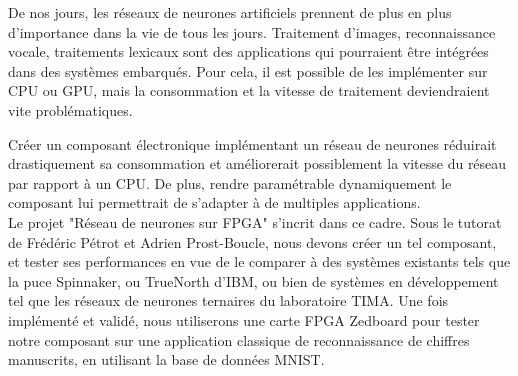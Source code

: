 De nos jours, les réseaux de neurones artificiels prennent de plus en plus d'importance
dans la vie de tous les jours. Traitement d'images, reconnaissance vocale, traitements lexicaux sont
des applications qui pourraient être intégrées dans des systèmes embarqués. Pour cela, il est possible 
de les implémenter sur CPU ou GPU, mais la consommation et la vitesse de traitement deviendraient vite problématiques.

Créer un composant électronique implémentant un réseau de neurones réduirait drastiquement sa consommation
et améliorerait possiblement la vitesse du réseau par rapport à un CPU. De plus, rendre paramétrable dynamiquement le
composant lui permettrait de s'adapter à de multiples applications.\\

Le projet "Réseau de neurones sur FPGA" s'incrit dans ce cadre. Sous le tutorat
de Frédéric Pétrot et Adrien Prost-Boucle, nous devons créer un tel composant,
et tester ses performances en vue de le comparer à des systèmes existants tels
que la puce Spinnaker, ou TrueNorth d'IBM, ou bien de systèmes en développement
tel que les réseaux de neurones ternaires du laboratoire TIMA. Une fois
implémenté et validé, nous utiliserons une carte FPGA Zedboard pour tester notre
composant sur une application classique de reconnaissance de chiffres manuscrits,
en utilisant la base de données MNIST.
